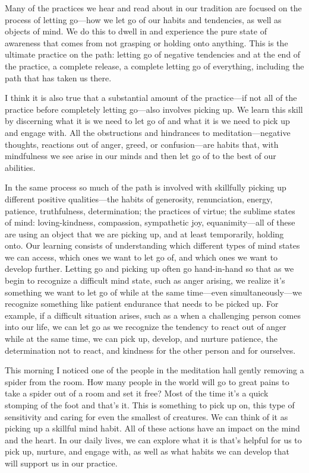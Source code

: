 
Many of the practices we hear and read about in our tradition are 
focused on the process of letting go---how we let go of our habits and 
tendencies, as well as objects of mind. We do this to dwell in and 
experience the pure state of awareness that comes from not grasping or 
holding onto anything. This is the ultimate practice on the path: 
letting go of negative tendencies and at the end of the practice, a 
complete release, a complete letting go of everything, including the 
path that has taken us there.

I think it is also true that a substantial amount of the practice---if 
not all of the practice before completely letting go---also involves 
picking up. We learn this skill by discerning what it is we need to let 
go of and what it is we need to pick up and engage with. All the 
obstructions and hindrances to meditation---negative thoughts, 
reactions out of anger, greed, or confusion---are habits that, with 
mindfulness we see arise in our minds and then let go of to the best of 
our abilities.

In the same process so much of the path is involved with skillfully 
picking up different positive qualities---the habits of generosity, 
renunciation, energy, patience, truthfulness, determination; the 
practices of virtue; the sublime states of mind: loving-kindness, 
compassion, sympathetic joy, equanimity---all of these are using an 
object that we are picking up, and at least temporarily, holding onto. 
Our learning consists of understanding which different types of mind 
states we can access, which ones we want to let go of, and which ones 
we want to develop further. Letting go and picking up often go 
hand-in-hand so that as we begin to recognize a difficult mind state, 
such as anger arising, we realize it's something we want to let go of 
while at the same time---even simultaneously---we recognize something 
like patient endurance that needs to be picked up. For example, if a 
difficult situation arises, such as a when a challenging person comes 
into our life, we can let go as we recognize the tendency to react out 
of anger while at the same time, we can pick up, develop, and nurture 
patience, the determination not to react, and kindness for the other 
person and for ourselves.

This morning I noticed one of the people in the meditation hall gently 
removing a spider from the room. How many people in the world will go 
to great pains to take a spider out of a room and set it free? Most of 
the time it's a quick stomping of the foot and that's it. This is 
something to pick up on, this type of sensitivity and caring for even 
the smallest of creatures. We can think of it as picking up a skillful 
mind habit. All of these actions have an impact on the mind and the 
heart. In our daily lives, we can explore what it is that's helpful for 
us to pick up, nurture, and engage with, as well as what habits we can 
develop that will support us in our practice.

